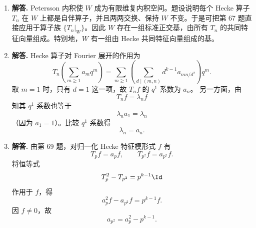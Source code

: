 \begin{enumerate}[label=\textbf{\arabic*.}, leftmargin=*, itemsep=1em]
\item \textbf{解答.} Petersson 内积使 \(W\) 成为有限维复内积空间。题设说明每个 Hecke 算子 \(T_n\) 在 \(W\) 上都是自伴算子，并且两两交换、保持 \(W\) 不变。于是可把第 67 题直接应用于算子族 \(\{T_n|_W\}\)。因此 \(W\) 存在一组标准正交基，由所有 \(T_n\) 的共同特征向量组成。特别地，\(W\) 有一组由 Hecke 共同特征向量组成的基。

\item \textbf{解答.} Hecke 算子对 Fourier 展开的作用为
\[
T_n\!\left(\sum_{m\ge1}a_m q^m\right)
=\sum_{m\ge1}\left(\sum_{d\mid(m,n)} d^{k-1}a_{mn/d^2}\right)q^m.
\]
取 \(m=1\) 时，只有 \(d=1\) 这一项，故 \(T_n f\) 的 \(q^1\) 系数为 \(a_n\)。  
另一方面，由
\[
T_n f=\lambda_n f
\]
知其 \(q^1\) 系数也等于
\[
\lambda_n a_1=\lambda_n
\]
（因为 \(a_1=1\)）。比较 \(q^1\) 系数得
\[
\lambda_n=a_n.
\]

\item \textbf{解答.} 由第 69 题，对归一化 Hecke 特征模形式 \(f\) 有
\[
T_p f=a_p f,\qquad T_{p^2}f=a_{p^2}f.
\]
将恒等式
\[
T_p^2-T_{p^2}=p^{k-1}\Id
\]
作用于 \(f\)，得
\[
a_p^2 f-a_{p^2}f=p^{k-1}f.
\]
因 \(f\neq0\)，故
\[
a_{p^2}=a_p^2-p^{k-1}.
\]
\end{enumerate}




